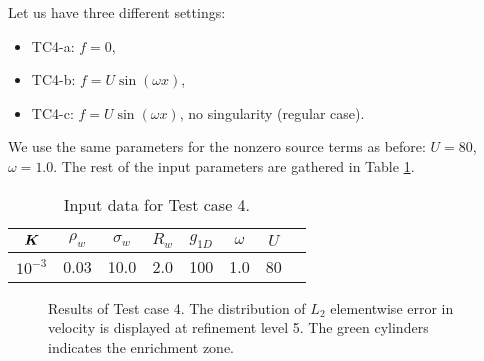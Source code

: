 Let us have three different settings: 
\begin{itemize}
    \item TC4-a: $f=0$,
    \item TC4-b: $f=U\sin(\omega x)$,
    \item TC4-c: $f=U\sin(\omega x)$, no singularity (regular case).
\end{itemize}
We use the same parameters for the nonzero source terms as before: $U=80$, $\omega=1.0$.
The rest of the input parameters are gathered in Table \ref{tab:tc4_data}.
%
\begin{table}[!htb]
\begin{center}
\begin{tabular}{cccccccc}
\toprule
$\mathbf{\boldsymbol{K}}$ & $\rho_w$ & $\sigma_w$ & $R_w$ & $g_{1D}$ & $\omega$ & $U$ \\
\midrule
$10^{-3}$ & 0.03 & 10.0 & 2.0 & 100 & 1.0 & 80\\
\bottomrule
\end{tabular}
\caption{Input data for Test case 4.}
\label{tab:tc4_data}
\end{center}
\end{table}
%
\begin{figure}[!htb]
    \centering
    \caption[Error distribution in Test case 4.]
    {Results of Test case 4. The distribution of $L_2$ elementwise error in velocity is displayed at refinement level 5.
    The green cylinders indicates the enrichment zone. }
    \label{fig:mh_tc4_error}
\end{figure}


